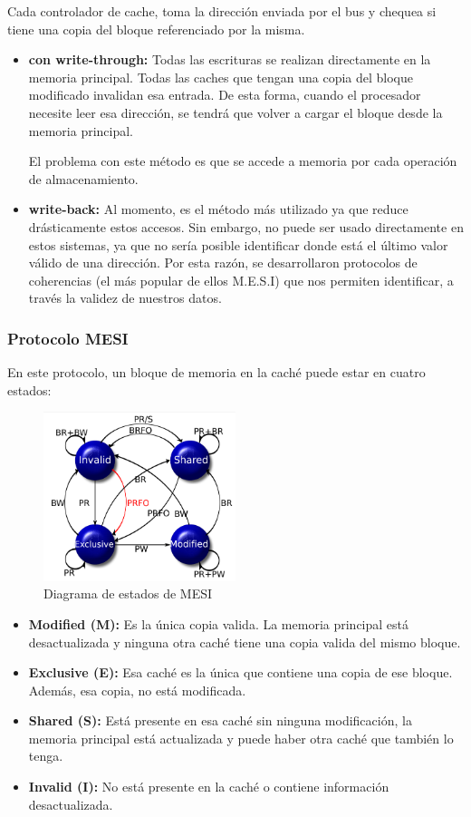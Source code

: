 Cada controlador de cache, toma la dirección enviada por el bus y chequea si tiene una copia del bloque referenciado por la misma.

\begin{itemize}
	\item \textbf{con write-through:} Todas las escrituras se realizan directamente en la memoria principal. Todas las caches que tengan una copia del bloque modificado invalidan esa entrada. De esta forma, cuando el procesador necesite leer esa dirección, se tendrá que volver a cargar el bloque desde la memoria principal.
	
	El problema con este método es que se accede a memoria por cada operación de almacenamiento.
	
	\item  \textbf{write-back:} Al momento, es el método más utilizado ya que reduce drásticamente estos accesos. Sin embargo, no puede ser usado directamente en estos sistemas, ya que no sería posible identificar donde está el último valor válido de una dirección. Por esta razón, se desarrollaron protocolos de coherencias (el más popular de ellos M.E.S.I) que nos permiten identificar, a través la validez de nuestros datos.
\end{itemize}

\subsubsection{Protocolo MESI}
En este protocolo, un bloque de memoria en la caché puede estar en cuatro estados:

\begin{figure}[ht]
	\centering
	\includegraphics[width=0.5\textwidth]{imagenes/mesi-state-graph}
	\caption{Diagrama de estados de MESI}
	\label{fig:mesiDiagram}
\end{figure}

\begin{itemize}
	\item \textbf{Modified (M):} Es la única copia valida. La memoria principal está desactualizada y ninguna otra caché tiene una copia valida del mismo bloque.
	\item \textbf{Exclusive (E):} Esa caché es la única que contiene una copia de ese bloque. Además, esa copia, no está modificada.
	\item \textbf{Shared (S):} Está presente en esa caché sin ninguna modificación, la memoria principal está actualizada y puede haber otra caché que también lo tenga.
	\item \textbf{Invalid (I):} No está presente en la caché o contiene información desactualizada.
\end{itemize}

